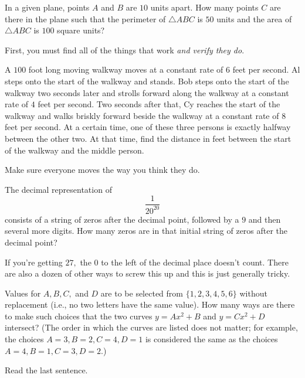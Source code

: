 \documentclass[mast]{lucky}
\begin{document}
\begin{prob}[AMC 10B 2019/10]{3}
In a given plane, points $A$ and $B$ are $10$ units apart. How many points $C$ are there in the plane such that the perimeter of $\triangle ABC$ is $50$ units and the area of $\triangle ABC$ is $100$ square units?
\begin{mistakes}
    \begin{mistake}
        First, you must find all of the things that work \emph{and verify they do}.
    \end{mistake}
\end{mistakes}
\end{prob}

\begin{prob}[AIME I 2007/2]{3}
A $100$ foot long moving walkway moves at a constant rate of $6$ feet per second. Al steps onto the start of the walkway and stands. Bob steps onto the start of the walkway two seconds later and strolls forward along the walkway at a constant rate of $4$ feet per second. Two seconds after that, Cy reaches the start of the walkway and walks briskly forward beside the walkway at a constant rate of $8$ feet per second. At a certain time, one of these three persons is exactly halfway between the other two. At that time, find the distance in feet between the start of the walkway and the middle person.
\begin{mistakes}
    \begin{mistake}
        Make sure everyone moves the way you think they do.
    \end{mistake}
\end{mistakes}
\end{prob}

\begin{prob}[AMC 10B 2020/12]{3}
The decimal representation of\[\dfrac{1}{20^{20}}\]consists of a string of zeros after the decimal point, followed by a $9$ and then several more digits. How many zeros are in that initial string of zeros after the decimal point?
\begin{mistakes}
    \begin{mistake}
        If you're getting $27,$ the $0$ to the left of the decimal place doesn't count. There are also a dozen of other ways to screw this up and this is just generally tricky.
    \end{mistake}
\end{mistakes}
\end{prob}

\begin{prob}[AMC 10A 2021/15]{3}
Values for $A, B, C,$ and $D$ are to be selected from $\{1, 2, 3, 4, 5, 6 \}$ without replacement (i.e., no two letters have the same value). How many ways are there to make such choices that the two curves $y=Ax^2+B$ and $y=Cx^2+D$ intersect? (The order in which the curves are listed does not matter; for example, the choices $A=3, B=2, C=4, D=1$ is considered the same as the choices $A=4, B=1, C=3, D=2.$)
\begin{mistakes}
    \begin{mistake}
        Read the last sentence.
    \end{mistake}
\end{mistakes}
\end{prob}
\end{document}
